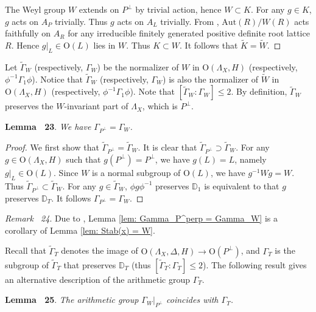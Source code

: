 \documentclass[
]{article}
\begin{document}
The Weyl group \(W\) extends on \(P^\perp\) by trivial action, hence
\(W\subset K\). For any \(g\in K\), \(g\) acts on \(A_P\) trivially.
Thus \(g\) acts on \(A_L\) trivially. From
\cite[PLATE I--X]{bourbaki2002lie4-6}, \(\mathrm{Aut}(R)/W(R)\) acts
faithfully on \(A_R\) for any irreducible finitely generated positive
definite root lattice \(R\). Hence \(g|_L\in\mathrm{O}(L)\) lies in
\(W\). Thus \(K\subset W\). It follows that
\(\widetilde{K}=\widetilde{W}\).~◻

Let \(\widetilde\Gamma_W\) (respectively, \(\Gamma_W\)) be the
normalizer of \(W\) in \(\mathrm{O}(\Lambda_X,H)\) (respectively,
\(\phi^{-1}\Gamma_1\phi\)). Notice that \(\widetilde\Gamma_W\)
(respectively, \(\Gamma_W\)) is also the normalizer of \(\widetilde{W}\)
in \(\mathrm{O}(\Lambda_X,H)\) (respectively,
\(\phi^{-1}\Gamma_1\phi\)). Note that
\([\widetilde{\Gamma}_W:\Gamma_W]\le 2\). By definition,
\(\widetilde\Gamma_W\) preserves the \(W\)-invariant part of
\(\Lambda_X\), which is \(P^\perp\).

\textbf{Lemma~ 23}. \emph{\label{lem: Gamma_P^perp = Gamma_W} We have
\(\Gamma_{P^\perp}=\Gamma_W\).}

\emph{Proof.} We first show that
\(\widetilde\Gamma_{P^\perp}=\widetilde\Gamma_W\). It is clear that
\(\widetilde\Gamma_{P^\perp} \supset \widetilde\Gamma_W\). For any
\(g\in\mathrm{O}(\Lambda_X,H)\) such that \(g(P^\perp)=P^\perp\), we
have \(g(L)=L\), namely \(g|_L\in\mathrm{O}(L)\). Since \(W\) is a
normal subgroup of \(\mathrm{O}(L)\), we have \(g^{-1}Wg=W\). Thus
\(\widetilde\Gamma_{P^\perp} \subset \widetilde\Gamma_W\). For any
\(g\in\widetilde\Gamma_W\), \(\phi g\phi^{-1}\) preserves
\(\mathbb{D}_1\) is equivalent to that \(g\) preserves \(\mathbb{D}_T\).
It follows \(\Gamma_{P^\perp}=\Gamma_W\).~◻

\emph{Remark~ 24}. Due to \cite[Lemma A.4]{yu2020fourfolds}, Lemma
\ref{lem: Gamma_P^perp = Gamma_W} is a corollary of Lemma
\ref{lem: Stab(x) = W}.

Recall that \(\widetilde{\Gamma}_T\) denotes the image of
\(\mathrm{O}(\Lambda_X,\Delta,H) \to \mathrm{O}(P^\perp)\), and
\(\Gamma_T\) is the subgroup of \(\widetilde{\Gamma}_T\) that preserves
\(\mathbb{D}_T\) (thus \([\widetilde{\Gamma}_T:\Gamma_T]\le 2\)). The
following result gives an alternative description of the arithmetic
group \(\Gamma_T\).

\textbf{Lemma~ 25}. \emph{\label{lem: Gamma_W|_P^perp = Gamma_T} The
arithmetic group \(\Gamma_W|_{P^\perp}\) coincides with \(\Gamma_T\).}
\end{document}
